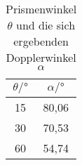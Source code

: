 \begin{table}[h!]
  \centering
  \caption{Prismenwinkel $\theta$ und die sich ergebenden Dopplerwinkel $\alpha$}
  \label{tab:alpha}
  \begin{tabular}{c c}
    \toprule
      $\theta/°$  &  $\alpha/°$     \\
      \midrule
    15  &   80,06 \\
    30  &   70,53 \\
    60  &   54,74 \\
    \bottomrule
  \end{tabular}
\end{table}

%
